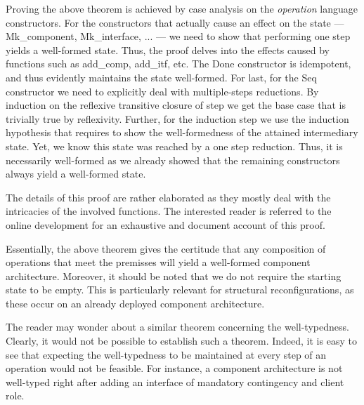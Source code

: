	
		Proving the above theorem is achieved by case analysis on the \textit{operation} language constructors. 
	For the constructors that actually cause an effect on the \textsf{state} --- \textsf{Mk\_component}, \textsf{Mk\_interface}, ... ---
	we need to show that performing one \textsf{step} yields a well-formed \textsf{state}.
	Thus, the proof delves into the effects caused by functions such as \textsf{add\_comp}, \textsf{add\_itf}, etc.
    The \textsf{Done} constructor is idempotent, and thus evidently maintains the \textsf{state} well-formed.	
	For last, for the \textsf{Seq} constructor we need to explicitly deal with multiple-steps reductions. By
	induction on the reflexive transitive closure of \textsf{step} we get the base case that is trivially true by reflexivity.
	Further, for the induction step we use the induction hypothesis that requires to show the well-formedness
	of the attained intermediary \textsf{state}. Yet, we know this state was reached by a one \textsf{step} reduction. Thus,
	it is necessarily well-formed as we already showed that the remaining constructors always yield a well-formed state.
		
		The details of this proof are rather elaborated as they mostly deal with the intricacies of the
	involved functions. The interested reader is referred to the online development for an exhaustive
	and document account of this proof.	
	
	
	Essentially, the above theorem gives the certitude that any composition of \textsf{operation}s
  that meet the premisses will yield a well-formed \textsf{component} architecture. Moreover, it should be noted that
  we do not require the starting \textsf{state} to be empty. This is particularly relevant for structural reconfigurations, as these
  occur on an already deployed \textsf{component} architecture.            

		The reader may wonder about a similar theorem concerning the well-typedness.  Clearly, it would not be possible to establish
   	such a theorem. Indeed, it is easy to see that expecting the well-typedness to be maintained at every \textsf{step}
   	of an \textsf{operation} would not be feasible. For instance, a \textsf{component} architecture is not well-typed   	
   	right after adding an \textsf{interface} of \textsf{mandatory}
   	\textsf{contingency} and \textsf{client} \textsf{role}. 
   	
